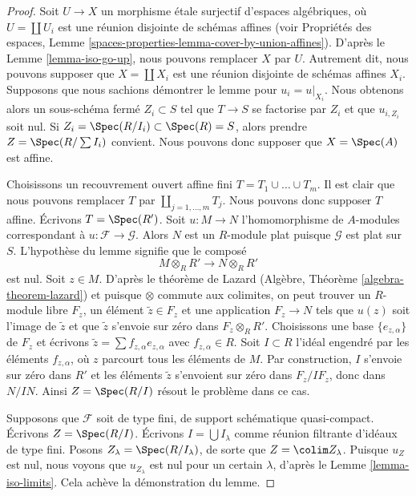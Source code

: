 \begin{proof}
Soit $U \to X$ un morphisme \'etale surjectif d'espaces algébriques,
où $U = \coprod U_i$ est une réunion disjointe de schémas affines (voir
Propriétés des espaces, Lemme
\ref{spaces-properties-lemma-cover-by-union-affines}).
D'après le Lemme \ref{lemma-iso-go-up}, nous pouvons
remplacer $X$ par $U$. Autrement dit, nous pouvons supposer que $X = \coprod X_i$
est une réunion disjointe de schémas affines $X_i$. Supposons que nous sachions démontrer
le lemme pour $u_i = u|_{X_i}$. Nous obtenons alors un sous-schéma fermé
$Z_i \subset S$ tel que $T \to S$ se factorise par $Z_i$ et que
$u_{i, Z_i}$ soit nul. Si
$Z_i = \Spec(R/I_i) \subset \Spec(R) = S$, alors prendre
$Z = \Spec(R/\sum I_i)$ convient. Nous pouvons donc supposer que
$X = \Spec(A)$ est affine.

\medskip\noindent
Choisissons un recouvrement ouvert affine fini $T = T_1 \cup \ldots \cup T_m$.
Il est clair que nous pouvons remplacer $T$ par $\coprod_{j = 1, \ldots, m} T_j$.
Nous pouvons donc supposer $T$ affine. Écrivons $T = \Spec(R')$.
Soit $u : M \to N$ l'homomorphisme de $A$-modules
correspondant à $u : \mathcal{F} \to \mathcal{G}$.
Alors $N$ est un $R$-module plat puisque $\mathcal{G}$ est plat sur $S$.
L'hypothèse du lemme signifie que le composé
$$
M \otimes_R R' \to N \otimes_R R'
$$
est nul. Soit $z \in M$. D'après le théorème de Lazard
(Algèbre, Théorème \ref{algebra-theorem-lazard}) et puisque
$\otimes$ commute aux colimites, on peut trouver un $R$-module libre
$F_z$, un élément $\tilde z \in F_z$ et une application $F_z \to N$ tels que
$u(z)$ soit l'image de $\tilde z$ et que $\tilde z$ s'envoie sur zéro dans
$F_z \otimes_R R'$. Choisissons une base $\{e_{z, \alpha}\}$ de $F_z$ et écrivons
$\tilde z = \sum f_{z, \alpha} e_{z, \alpha}$ avec $f_{z, \alpha} \in R$.
Soit $I \subset R$ l'idéal engendré par les éléments $f_{z, \alpha}$,
où $z$ parcourt tous les éléments de $M$.
Par construction, $I$ s'envoie sur zéro dans $R'$ et les éléments $\tilde z$
s'envoient sur zéro dans $F_z/IF_z$, donc dans $N/IN$. Ainsi $Z = \Spec(R/I)$
résout le problème dans ce cas.

\medskip\noindent
Supposons que $\mathcal{F}$ soit de type fini, de support schématique
quasi-compact. Écrivons $Z = \Spec(R/I)$.
Écrivons $I = \bigcup I_\lambda$ comme réunion filtrante d'idéaux de type fini.
Posons $Z_\lambda = \Spec(R/I_\lambda)$, de sorte que $Z = \colim Z_\lambda$.
Puisque $u_Z$ est nul, nous voyons que $u_{Z_\lambda}$ est nul
pour un certain $\lambda$, d'après le Lemme \ref{lemma-iso-limits}.
Cela achève la démonstration du lemme.
\end{proof}

